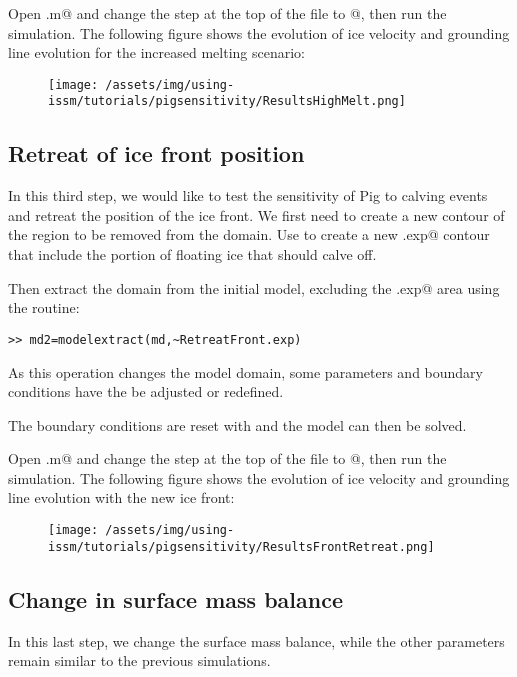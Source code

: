 Open \verb@runme.m@ and change the step at the top of the file to @, then run the simulation. The following figure shows the evolution of ice velocity and grounding line evolution for the increased melting scenario:
\begin{figure}[H]
	\begin{center}
		\texttt{[image: /assets/img/using-issm/tutorials/pigsensitivity/ResultsHighMelt.png]}
	\end{center}
\end{figure}
\subsection{Retreat of ice front position}%
In this third step, we would like to test the sensitivity of Pig to calving events and retreat the position of the ice front. We first need to create a new contour of the region to be removed from the domain. Use \verb@exptool@ to create a new \verb@RetreatFront.exp@ contour that include the portion of floating ice that should calve off.

Then extract the domain from the initial model, excluding the \verb@RetreatFront.exp@ area using the \verb@extrude@ routine:
\begin{verbatim}>> md2=modelextract(md,~RetreatFront.exp)\end{verbatim}

As this operation changes the model domain, some parameters and boundary conditions have the be adjusted or redefined.

The boundary conditions are reset with \verb@SetMarineIceSheetBC@ and the model can then be solved.

Open \verb@runme.m@ and change the step at the top of the file to @, then run the simulation. The following figure shows the evolution of ice velocity and grounding line evolution with the new ice front:
\begin{figure}[H]
	\begin{center}
		\texttt{[image: /assets/img/using-issm/tutorials/pigsensitivity/ResultsFrontRetreat.png]}
	\end{center}
\end{figure}
\subsection{Change in surface mass balance}%
In this last step, we change the surface mass balance, while the other parameters remain similar to the previous simulations.

